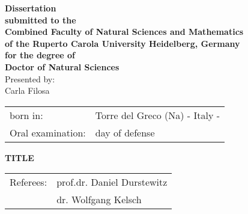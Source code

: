 \thispagestyle{plain}

\vspace*{1cm}

\begin{center}
\begin{large}
{\textbf{Dissertation\\submitted to the\\Combined Faculty of Natural Sciences and Mathematics\\of the Ruperto Carola University Heidelberg, Germany\\for the degree of\\Doctor of Natural Sciences}}\\
\vspace{10cm}
Presented by:\\ Carla Filosa\\
\vspace{1cm}
\begin{tabular}{ll}
born in: & Torre del Greco (Na) - Italy - \\
Oral examination: &  day of defense \\
\end{tabular}
\end{large}
\end{center}
\clearpage
\thispagestyle{plain}

\begin{center}
\begin{large}
\vspace*{3cm}
{\Huge \textbf{TITLE}}

\vspace*{15cm}

\begin{tabular}{ll}
Referees: & prof.dr. Daniel Durstewitz \\
&  dr. Wolfgang Kelsch \\
\end{tabular}
\end{large}
\end{center}
\afterpage{\blankpage}





